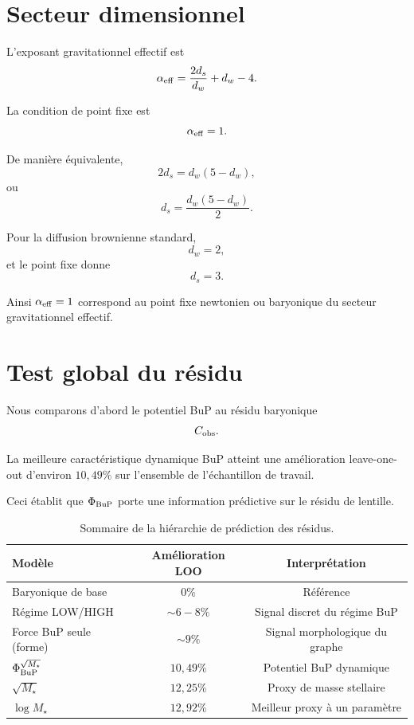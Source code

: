 \documentclass[11pt,a4paper]{article}
\begin{document}
\section{Secteur dimensionnel}

L'exposant gravitationnel effectif est
\[
\alpha_{\rm eff}
=
\frac{2d_s}{d_w}+d_w-4.
\]

La condition de point fixe est
\[
\alpha_{\rm eff}=1.
\]

De manière équivalente,
\[
2d_s=d_w(5-d_w),
\]
ou
\[
d_s=\frac{d_w(5-d_w)}{2}.
\]

Pour la diffusion brownienne standard,
\[
d_w=2,
\]
et le point fixe donne
\[
d_s=3.
\]

Ainsi \(\alpha_{\rm eff}=1\) correspond au point fixe newtonien ou baryonique du secteur gravitationnel effectif.

\section{Test global du résidu}

Nous comparons d'abord le potentiel BuP au résidu baryonique
\[
C_{\rm obs}.
\]

La meilleure caractéristique dynamique BuP atteint une amélioration leave-one-out d'environ \(10,49\%\) sur l'ensemble de l'échantillon de travail.

Ceci établit que \(\Phi_{\rm BuP}\) porte une information prédictive sur le résidu de lentille.

\begin{table}[h]
\centering
\begin{tabular}{lcc}
\toprule
Modèle & Amélioration LOO & Interprétation \\
\midrule
Baryonique de base & 0\% & Référence \\
Régime LOW/HIGH & \(\sim 6-8\%\) & Signal discret du régime BuP \\
Force BuP seule (forme) & \(\sim 9\%\) & Signal morphologique du graphe \\
\(\Phi_{\rm BuP}^{\sqrt{M_\star}}\) & \(10,49\%\) & Potentiel BuP dynamique \\
\(\sqrt{M_\star}\) & \(12,25\%\) & Proxy de masse stellaire \\
\(\log M_\star\) & \(12,92\%\) & Meilleur proxy à un paramètre \\
\bottomrule
\end{tabular}
\caption{Sommaire de la hiérarchie de prédiction des résidus.}
\end{table}
\end{document}
